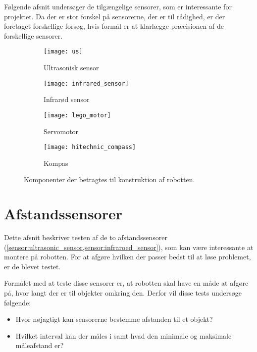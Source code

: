 \label{sensorer}
Følgende afsnit undersøger de tilgængelige sensorer, som er interessante for projektet.
Da der er stor forskel på sensorerne, der er til rådighed, er der foretaget forskellige forsøg, hvis formål er at klarlægge præcisionen af de forskellige sensorer.

\begin{figure}[h]
\centering
\begin{subfigure}[b]{.4\textwidth}
\centering
\texttt{[image: us]}
\caption{Ultrasonisk sensor}
\label{sensor:ultrasonic_sensor}
\end{subfigure}
\begin{subfigure}[b]{.4\textwidth}
\centering
\texttt{[image: infrared\_sensor]}
\caption{Infrarød sensor}
\label{sensor:infraroed_sensor}
\end{subfigure}
\begin{subfigure}[b]{.4\textwidth}
\centering
\texttt{[image: lego\_motor]}
\caption{Servomotor}
\label{sensor:servo_motor}
\end{subfigure}
\begin{subfigure}[b]{.4\textwidth}
\centering
\texttt{[image: hitechnic\_compass]}
\caption{Kompas}
\label{sensor:compass}
\end{subfigure}
\caption{Komponenter der betragtes til konstruktion af robotten.}
\end{figure}

\section{Afstandssensorer}
Dette afsnit beskriver testen af de to afstandssensorer (\cref{sensor:ultrasonic_sensor,sensor:infraroed_sensor}), som kan være interessante at montere på robotten.
For at afgøre hvilken der passer bedst til at løse problemet, er de blevet testet.

Formålet med at teste disse sensorer er, at robotten skal have en måde at afgøre på, hvor langt der er til objekter omkring den.
Derfor vil disse tests undersøge følgende:
\begin{itemize}
\item Hvor nøjagtigt kan sensorerne bestemme afstanden til et objekt?
\item Hvilket interval kan der måles i samt hvad den minimale og maksimale måleafstand er?
\end{itemize}

